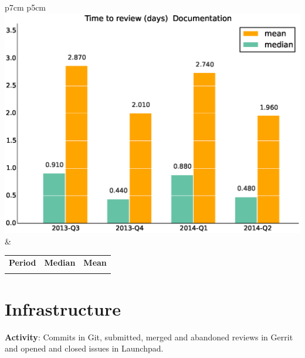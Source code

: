 \documentclass[a4wide,11pt]{report}
\begin{document}
\begin{tabular}{p{7cm} p{5cm}}
    \vspace{0pt} 
    \includegraphics[scale=.35]{figs/timetoreview_medianDocumentation.eps}
    & 
    \vspace{0pt}
    \begin{tabular}{l|r|r|}%
    \bfseries Period & \bfseries Median & \bfseries Mean %
    \csvreader[head to column names]{data/timetoreview_medianDocumentation.csv}{}%
    {\\ & \mediantime & \meantime}
    \end{tabular}
\end{tabular}

\newpage
\section{Infrastructure}

\textbf{Activity}: Commits in Git, submitted, merged and abandoned reviews in Gerrit and opened and closed issues in Launchpad.
\end{document}
